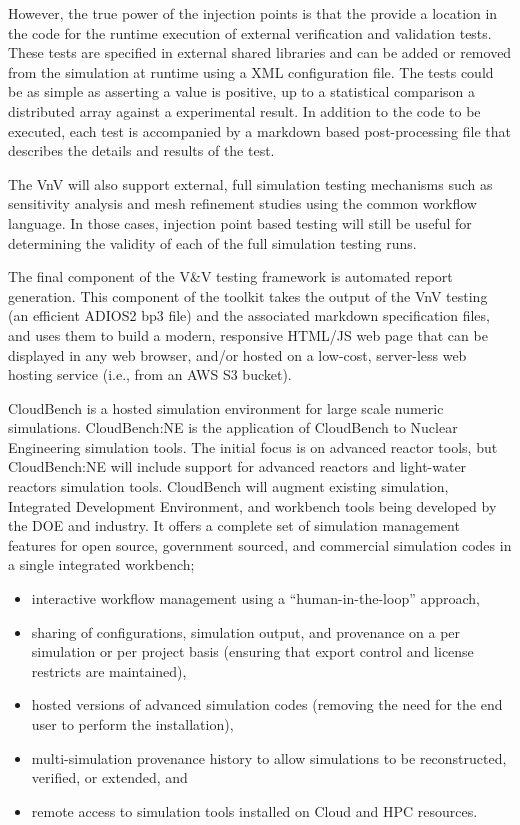 However, the true power of the injection points is that the provide a location in the code for the runtime execution of external verification and validation tests. These tests are specified in external shared 
libraries and can be added or removed from the simulation at runtime using a XML configuration file. The tests could be as simple as 
asserting a value is positive, up to a statistical comparison a distributed array against a experimental result. In addition to the code to be executed, each test is accompanied by 
a markdown based post-processing file that describes the details and results of the test. 

The VnV will also support external, full simulation testing mechanisms such as sensitivity analysis and mesh refinement studies using the common workflow language. In those cases, injection point based testing will still be useful for determining the validity of each of the full simulation testing runs. 

The final component of the V&V testing framework is automated report generation. This component of the toolkit takes the output of the VnV testing (an efficient ADIOS2 bp3 file) and the associated markdown specification files, and uses 
them to build a modern, responsive HTML/JS web page that can be displayed in any web browser, and/or hosted on a low-cost, server-less web hosting service (i.e., from an AWS S3 bucket). 




CloudBench is a hosted simulation environment for large scale numeric
simulations. CloudBench:NE is the application of CloudBench to Nuclear
Engineering simulation tools. The initial focus is on advanced reactor
tools, but CloudBench:NE will include support for advanced reactors
and light-water reactors simulation tools. CloudBench will augment
existing simulation, Integrated Development Environment, and workbench
tools being developed by the DOE and industry. It offers a complete
set of simulation management features for open source, government
sourced, and commercial simulation codes in a single integrated
workbench;

\begin{itemize}
\item interactive workflow management using a ``human-in-the-loop'' approach,
\item sharing of configurations, simulation output, and provenance on
  a per simulation or per project basis (ensuring that export control
  and license restricts are maintained),
\item hosted versions of advanced simulation codes (removing the need
  for the end user to perform the installation),
\item multi-simulation provenance history to allow simulations to be
  reconstructed, verified, or extended, and
\item remote access to simulation tools installed on Cloud and HPC
  resources.
\end{itemize}


